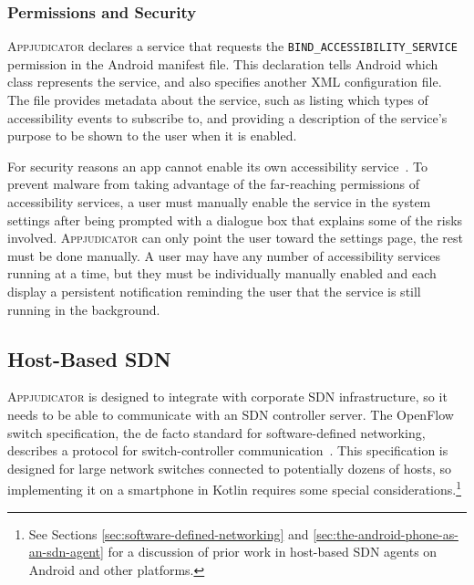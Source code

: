 
\subsubsection{Permissions and Security}
\label{sec:accessibility-permissions}

\textsc{Appjudicator} declares a service that requests the
\texttt{BIND\_ACCESSIBILITY\_SERVICE} permission in the Android manifest file.
This declaration tells Android which class represents the service, and also
specifies another XML configuration file.  The file provides metadata about the
service, such as listing which types of accessibility events to subscribe to,
and providing a description of the service's purpose to be shown to the user
when it is enabled.

For security reasons an app cannot enable its own accessibility
service~\cite{kalysch2018}. To prevent malware from taking advantage of the
far-reaching permissions of accessibility services, a user must manually enable
the service in the system settings after being prompted with a dialogue box that
explains some of the risks involved. \textsc{Appjudicator} can only point the
user toward the settings page, the rest must be done manually. A user may have
any number of accessibility services running at a time, but they must be
individually manually enabled and each display a persistent notification
reminding the user that the service is still running in the background.


\subsection{Host-Based SDN}
\label{sec:host-based-sdn}

\textsc{Appjudicator} is designed to integrate with corporate SDN
infrastructure, so it needs to be able to communicate with an SDN controller
server. The OpenFlow switch specification, the de facto standard for
software-defined networking, describes a protocol for switch-controller
communication~\cite{openflowspec}. This specification is designed for large
network switches connected to potentially dozens of hosts, so implementing it on
a smartphone in Kotlin requires some special considerations.\footnote{See
Sections \ref{sec:software-defined-networking} and
\ref{sec:the-android-phone-as-an-sdn-agent} for a discussion of prior work in
host-based SDN agents on Android and other platforms.}

